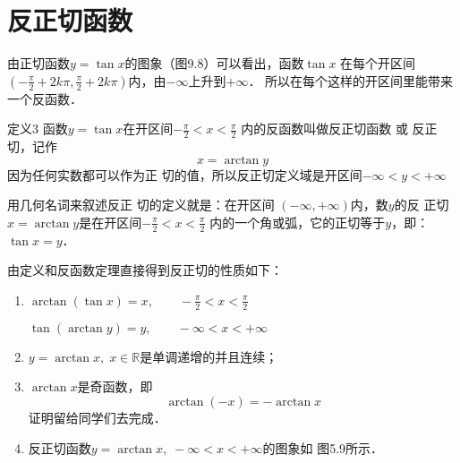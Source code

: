 \section{反正切函数}

由正切函数$y=\tan x$的图象（图9.8）可以看出，函数$\tan x$
在每个开区间$\left(-\frac{\pi}{2}+2k\pi, \frac{\pi}{2}+2k\pi\right)$内，由$-\infty$上升到$+\infty$．
所以在每个这样的开区间里能带来一个反函数．


\begin{figure}[htp]
    \centering
{}
    \caption{}

\end{figure}



\begin{blk}{定义3}
    函数$y=\tan x$在开区间$-\frac{\pi}{2}<x<\frac{\pi}{2}$
内的反函数叫做反正切函数 或 反正
切，记作
\[x=\arctan y\]
因为任何实数都可以作为正
切的值，所以反正切定义域是开区间$-\infty<y<+\infty$
\end{blk}

用几何名词来叙述反正
切的定义就是：在开区间
$(-\infty, +\infty)$内，数$y$的反
正切$x=\arctan y$是在开区间$-\frac{\pi}{2}<x<\frac{\pi}{2}$
内的一个角或弧，它的正切等于$y$，即：$\tan x=y$．

由定义和反函数定理直接得到反正切的性质如下：
\begin{enumerate}
    \item $\arctan (\tan x)=x, \qquad -\frac{\pi}{2}<x<\frac{\pi}{2}$
    
    $\tan (\arctan y)=y,\qquad -\infty<x<+\infty$
    \item $y=\arctan x,\; x\in\mathbb{R}$是单调递增的并且连续；
    \item $\arctan x$是奇函数，即
    \[\arctan (-x)=-\arctan x\]
    证明留给同学们去完成．
    \item 反正切函数$y=\arctan x,\; -\infty<x<+\infty$的图象如
    图5.9所示．
\end{enumerate}

